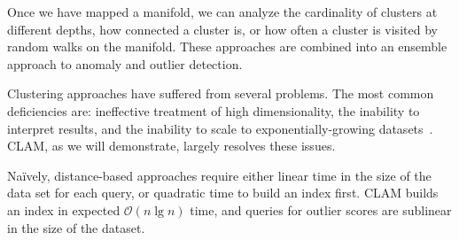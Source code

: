 Once we have mapped a manifold, we can analyze the cardinality of clusters at different depths, how connected a cluster is, or how often a cluster is visited by random walks on the manifold.
These approaches are combined into an ensemble approach to anomaly and outlier detection.

Clustering approaches have suffered from several problems.
The most common deficiencies are:
ineffective treatment of high dimensionality,
the inability to interpret results, and
the inability to scale to exponentially-growing datasets~\cite{agrawal1998automatic}.
CLAM, as we will demonstrate, largely resolves these issues.

Na\"ively, distance-based approaches require either linear time in the size of the data set for each query,
or quadratic time to build an index first.
CLAM builds an index in expected $\mathcal{O}(n \lg n)$ time, and queries for outlier scores are sublinear in the size of the dataset.
